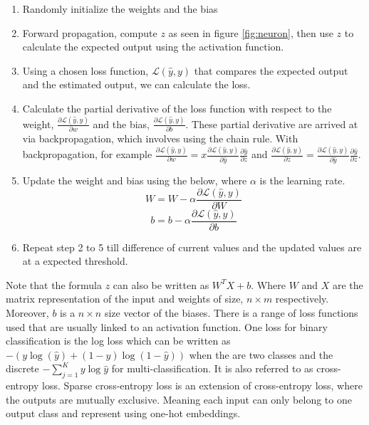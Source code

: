 \begin{enumerate}
 \item  Randomly initialize the weights and the bias
 \item Forward propagation, compute $z$ as seen in figure \ref{fig:neuron}, then use $z$  to calculate the expected output using the activation function. 
  \item Using a chosen loss function, $\mathcal{L}(\hat{y},y)$ that compares the expected output and the estimated output, we can calculate the loss.
  \item Calculate the partial derivative of the loss function with respect to the weight, $\frac{\partial \mathcal{L}(\hat{y},y)}{\partial w}$ and the bias, $\frac{\partial \mathcal{L}(\hat{y},y)}{\partial b}$. These partial derivative are arrived at via  backpropagation, which involves using the chain rule. With backpropagation, for example $\frac{\partial \mathcal{L}(\hat{y},y)}{\partial w } = x\frac{\partial \mathcal{L}(\hat{y},y)}{\partial \hat{y} } \frac{\partial \hat{y}}{\partial z }  $  and $\frac{\partial \mathcal{L}(\hat{y},y)}{\partial z} = \frac{\partial \mathcal{L}(\hat{y},y)}{\partial \hat{y} } \frac{\partial \hat{y}}{\partial z }  $.
    \item Update the weight and bias using the below, where $\alpha$ is the learning rate.
\[W = W - \alpha \frac{\partial \mathcal{L}(\hat{y},y)}{\partial W}\]
\[b = b - \alpha \frac{\partial \mathcal{L}(\hat{y},y)}{\partial b}\]
\item Repeat step 2 to 5 till difference of current values and the updated values are at a expected threshold.
\end{enumerate}

Note that the formula $z$ can also be written as $W^TX +b$. Where  $W$  and $X$ are the matrix representation of the input and weights of size, $n \times m $  respectively.  Moreover, $b$ is a $n  \times n$ size vector of the biases.
There is a range of loss functions used that are usually linked to an activation function. One loss for binary classification is the log loss which can be written as $ -(y \log{(\hat{y})} + (1-y)\log(1-\hat{y} ))$ when the are two classes and the discrete $ - \sum_{j=1}^{K} y\log{\hat{y}} $ for multi-classification. It is also referred to as cross-entropy loss. Sparse cross-entropy loss is an extension of cross-entropy loss, where the outputs are mutually exclusive.  Meaning each input can only belong to one output class and represent using one-hot embeddings.

